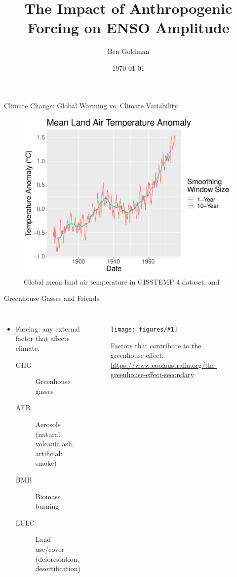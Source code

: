 \documentclass[aspectratio=1610]{beamer}
\title{The Impact of Anthropogenic Forcing on ENSO Amplitude}
\author{Ben Goldman}
\date{\today}
\newcommand{\myfig}[3]{
  \begin{figure}
    \centering
    \texttt{[image: figures/\#1]}
    \caption{#2}
    \label{fig:#3}
  \end{figure}
}
\begin{document}
\maketitle

\begin{frame}{Climate Change: Global Warming vs. Climate Variability}
  \begin{figure}
    \centering
    \includegraphics[width=0.9\textheight]{figures/intro_fig_3.pdf}
    \caption{Global mean land air temperature in GISSTEMP 4 dataset. \citep{gistemp2019giss} and \citep{lenssen2019improvements}}
    \label{fig:woohoo}
  \end{figure}
\end{frame}

\begin{frame}{Greenhouse Gasses and Friends}
  \begin{columns}
    \begin{itemize}
    \item \alert{Forcing}: any external factor that affects climate.
      \begin{description}
      \item[\alert{GHG}] Greenhouse gasses
      \item[\alert{AER}] Aerosols (natural: volcanic ash, artificial: smoke)
      \item[\alert{BMB}] Biomass burning
      \item[\alert{LULC}] Land use/cover (deforestation, desertification)
      \end{description}
    \end{itemize}
    \myfig{greenhouse_Effect.jpg}{Factors that contribute to the greenhouse effect. \url{https://www.coolaustralia.org/the-greenhouse-effect-secondary}}{this}
  \end{columns}
\end{frame}
\end{document}
